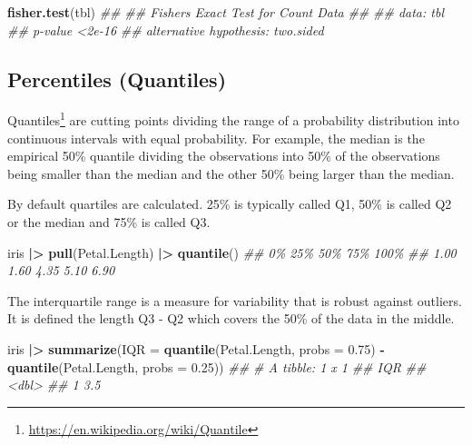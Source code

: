 \documentclass[
  notitlepage]{book}
\newenvironment{Shaded}{\begin{snugshade}}{\end{snugshade}}
\newcommand{\CommentTok}[1]{\textcolor[rgb]{0.56,0.35,0.01}{\textit{#1}}}
\newcommand{\DataTypeTok}[1]{\textcolor[rgb]{0.13,0.29,0.53}{#1}}
\newcommand{\ErrorTok}[1]{\textcolor[rgb]{0.64,0.00,0.00}{\textbf{#1}}}
\newcommand{\FloatTok}[1]{\textcolor[rgb]{0.00,0.00,0.81}{#1}}
\newcommand{\KeywordTok}[1]{\textcolor[rgb]{0.13,0.29,0.53}{\textbf{#1}}}
\newcommand{\NormalTok}[1]{#1}
\newcommand{\OperatorTok}[1]{\textcolor[rgb]{0.81,0.36,0.00}{\textbf{#1}}}
\newcommand{\StringTok}[1]{\textcolor[rgb]{0.31,0.60,0.02}{#1}}
\DeclareRobustCommand{\href}[2]{#2\footnote{\url{#1}}}
\begin{document}
\begin{Shaded}
\begin{Highlighting}[]
\KeywordTok{fisher.test}\NormalTok{(tbl)}
\CommentTok{\#\# }
\CommentTok{\#\#  Fisher\textquotesingle{}s Exact Test for Count Data}
\CommentTok{\#\# }
\CommentTok{\#\# data:  tbl}
\CommentTok{\#\# p{-}value \textless{}2e{-}16}
\CommentTok{\#\# alternative hypothesis: two.sided}
\end{Highlighting}
\end{Shaded}

\hypertarget{percentiles-quantiles}{%
\subsection{Percentiles (Quantiles)}\label{percentiles-quantiles}}

\href{https://en.wikipedia.org/wiki/Quantile}{Quantiles} are cutting points
dividing the range of a probability distribution into continuous
intervals with equal probability. For example, the median is the
empirical 50\% quantile dividing the observations into 50\% of the
observations being smaller than the median and the other 50\% being
larger than the median.

By default quartiles are calculated. 25\% is typically called Q1, 50\% is
called Q2 or the median and 75\% is called Q3.

\begin{Shaded}
\begin{Highlighting}[]
\NormalTok{iris }\OperatorTok{|}\ErrorTok{\textgreater{}}\StringTok{ }
\StringTok{  }\KeywordTok{pull}\NormalTok{(Petal.Length) }\OperatorTok{|}\ErrorTok{\textgreater{}}\StringTok{ }
\StringTok{  }\KeywordTok{quantile}\NormalTok{()}
\CommentTok{\#\#   0\%  25\%  50\%  75\% 100\% }
\CommentTok{\#\# 1.00 1.60 4.35 5.10 6.90}
\end{Highlighting}
\end{Shaded}

The interquartile range is a measure for variability that is robust
against outliers. It is defined the length Q3 - Q2 which covers the 50\%
of the data in the middle.

\begin{Shaded}
\begin{Highlighting}[]
\NormalTok{iris }\OperatorTok{|}\ErrorTok{\textgreater{}}\StringTok{ }
\StringTok{  }\KeywordTok{summarize}\NormalTok{(}\DataTypeTok{IQR =} 
  \KeywordTok{quantile}\NormalTok{(Petal.Length, }\DataTypeTok{probs =} \FloatTok{0.75}\NormalTok{) }\OperatorTok{{-}}\StringTok{ }
\StringTok{    }\KeywordTok{quantile}\NormalTok{(Petal.Length, }\DataTypeTok{probs =} \FloatTok{0.25}\NormalTok{))}
\CommentTok{\#\# \# A tibble: 1 x 1}
\CommentTok{\#\#     IQR}
\CommentTok{\#\#   \textless{}dbl\textgreater{}}
\CommentTok{\#\# 1   3.5}
\end{Highlighting}
\end{Shaded}
\end{document}
